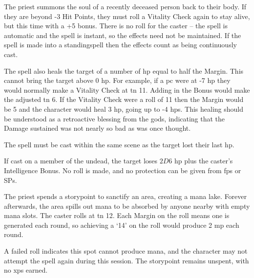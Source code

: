\begin{multicols}{2}

The priest summons the soul of a recently deceased person back to their body.
If they are beyond -3 Hit Points, they must roll a Vitality Check again to stay alive, but this time with a +5 bonus.
There is no roll for the caster -- the spell is automatic and the spell is instant, so the effects need not be maintained.
If the spell is made into a \gls{standingspell} then the effects count as being continuously cast.

The spell also heals the target of a number of \gls{hp} equal to half the Margin.
This cannot bring the target above 0 \gls{hp}.
For example, if a \gls{pc} were at -7 \gls{hp} they would normally make a Vitality Check at \gls{tn} 11.
Adding in the Bonus would make the adjusted \gls{tn} 6.
If the Vitality Check were a roll of 11 then the Margin would be 5 and the character would heal 3 \gls{hp}, going up to -4 \glspl{hp}.
This healing should be understood as a retroactive blessing from the gods, indicating that the Damage sustained was not nearly so bad as was once thought.

The spell must be cast within the same scene as the target lost their last \gls{hp}.

If cast on a member of the undead, the target loses $2D6$ \gls{hp} plus the caster's Intelligence Bonus.
No roll is made, and no protection can be given from \glspl{fp} or \glspl{SP}.


The priest spends a \gls{storypoint} to sanctify an area, creating a mana lake.
Forever afterwards, the area spills out mana to be absorbed by anyone nearby with empty mana slots.
The caster rolls at \gls{tn} 12.
Each Margin on the roll means one  is generated each round, so achieving a `14' on the roll would produce 2 \gls{mp} each round.

A failed roll indicates this spot cannot produce mana, and the character may not attempt the spell again during this session.
The \gls{storypoint} remains unspent, with no \glspl{xp} earned.

\end{multicols}


